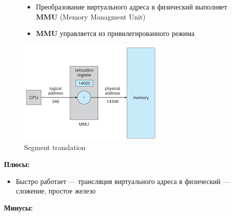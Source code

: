 \documentclass[../../lectures.tex]{subfiles}
\begin{document}
\begin{figure}[H]
\begin{minipage}[c]{0.6\linewidth}
\centering
\begin{itemize}
    \item Преобразование виртуального адреса в физический выполняет 
          \textbf{MMU} (Memory Managment Unit)
    \item \textbf{MMU} управляется из привилегированного режима
\end{itemize}
\end{minipage}
\hspace{0.5cm}
\begin{minipage}[c]{0.4\linewidth}
\centering
\includegraphics[width=\textwidth]{images/segment-translation.png}
\caption{Segment translation}
\end{minipage}
\end{figure}
\textbf{Плюсы:}
\begin{itemize}
    \item Быстро работает --- трансляция виртуального адреса в физический --- сложение, простое железо
\end{itemize}
\textbf{Минусы:}
\end{document}
